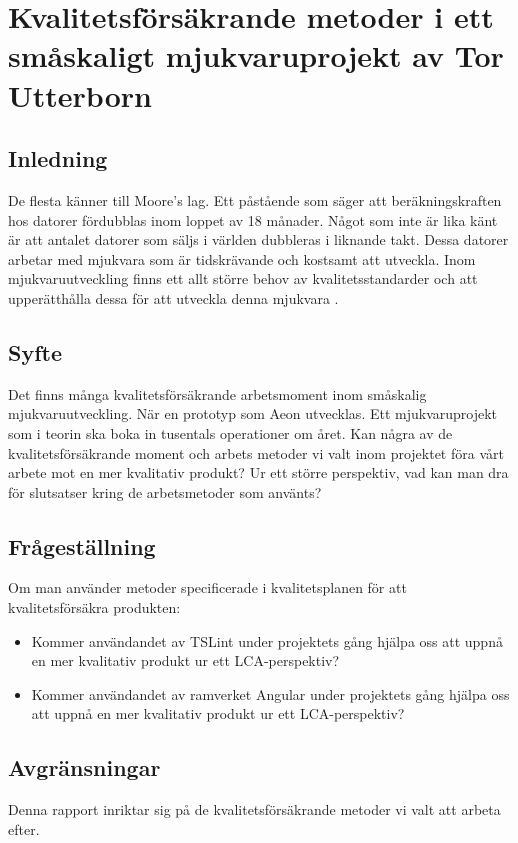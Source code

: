 \chapter{Kvalitetsförsäkrande metoder i ett småskaligt mjukvaruprojekt av Tor Utterborn}

\section{Inledning}

De flesta känner till Moore's lag. Ett påstående som säger att beräkningskraften hos datorer fördubblas inom loppet av 18 månader. 
Något som inte är lika känt är att antalet datorer som säljs i världen dubbleras i liknande takt. \cite{greenbiz}
Dessa datorer arbetar med mjukvara som är tidskrävande och kostsamt att utveckla. Inom mjukvaruutveckling finns ett allt större behov av kvalitetsstandarder och att upperätthålla dessa för att utveckla denna mjukvara \cite{linkedin}.

\section{Syfte}

Det finns många kvalitetsförsäkrande arbetsmoment inom småskalig mjukvaruutveckling. När en prototyp som Aeon utvecklas. Ett mjukvaruprojekt som i teorin ska boka in tusentals operationer om året. Kan några av de kvalitetsförsäkrande moment och arbets metoder vi valt inom projektet föra vårt arbete mot en mer kvalitativ produkt? Ur ett större perspektiv, vad kan man dra för slutsatser kring de arbetsmetoder som använts?

\section{Frågeställning}

Om man använder metoder specificerade i kvalitetsplanen för att kvalitetsförsäkra produkten: 
\begin{itemize}
	\item Kommer användandet av TSLint under projektets gång hjälpa oss att uppnå en mer kvalitativ produkt ur ett LCA-perspektiv?
	\item Kommer användandet av ramverket Angular under projektets gång hjälpa oss att uppnå en mer kvalitativ produkt ur ett LCA-perspektiv?
\end{itemize}




\section{Avgränsningar}
Denna rapport inriktar sig på de kvalitetsförsäkrande metoder vi valt att arbeta efter.

